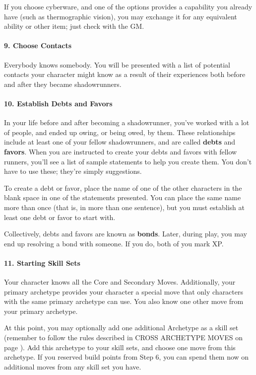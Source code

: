 \documentclass[oneside,10pt]{article}
\begin{document}
\begin{multicols}{2}
If you choose cyberware, and one of the options provides a
capability you already have (such as thermographic vision),
you may exchange it for any equivalent ability or other item;
just check with the GM.

\paragraph{9.  Choose Contacts}

Everybody knows somebody. You will be presented with a list of
potential contacts your character might know as a result of their
experiences both before and after they became shadowrunners.

\paragraph{10.  Establish Debts and Favors}

In your life before and after becoming a shadowrunner, you’ve worked
with a lot of people, and ended up owing, or being owed, by
them. These relationships include at least one of your fellow
shadowrunners, and are called \textbf{debts} and \textbf{favors}.
When you are instructed to create your debts and favors with fellow
runners, you’ll see a list of sample statements to help you create
them. You don’t have to use these; they’re simply suggestions.

To create a debt or favor, place the name of one of the other
characters in the blank space in one of the statements presented. You
can place the same name more than once (that is, in more than one
sentence), but you must establish at least one debt or favor to start
with.

Collectively, debts and favors are known as \textbf{bonds}. Later,
during play, you may end up resolving a bond with someone.  If you do,
both of you mark XP.

\paragraph{11.  Starting Skill Sets}

Your character knows all the Core and Secondary Moves. Additionally,
your primary archetype provides your character a special move that
only characters with the same primary archetype can use. You also know
one other move from your primary archetype.

At this point, you may optionally add one additional Archetype as a
skill set (remember to follow the rules described in CROSS ARCHETYPE
MOVES on page \pageref{crossarchetypemoves}). Add this archetype to your skill sets, and choose one move
from this archetype. If you reserved build points from Step 6, you can
spend them now on additional moves from any skill set you have.



\end{multicols}
\end{document}
